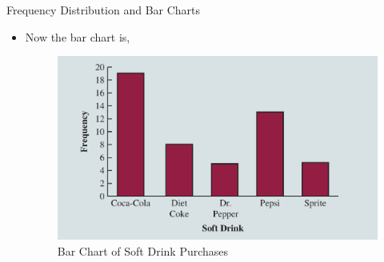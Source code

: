 \documentclass[8pt, usepdftitle=false]{beamer}
\begin{document}
\begin{frame}[allowframebreaks]{Frequency Distribution and Bar Charts}
\begin{itemize}






\framebreak

\vspace*{-1cm}
\item Now the bar chart is, 

\begin{figure}[H]
  \caption{Bar Chart of Soft Drink Purchases}
  \includegraphics[scale = .2]{Images/SoftDrink_BarChart.png}
\end{figure}



\end{itemize}
\end{frame}
\end{document}
